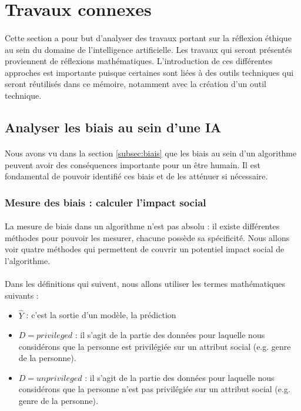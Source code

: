 \documentclass[10pt, french, a4paper]{report}
\begin{document}
\section{Travaux connexes}

\paragraph{}
Cette section a pour but d’analyser des travaux portant sur la réflexion éthique au sein du domaine de l’intelligence artificielle. Les travaux qui seront présentés proviennent de réflexions mathématiques. L’introduction de ces différentes approches est importante puisque certaines sont liées à des outils techniques qui seront réutilisés dans ce mémoire, notamment avec la création d’un outil technique.

\subsection{Analyser les biais au sein d'une IA}

\paragraph{}
Nous avons vu dans la section \ref{subsec:biais} que les biais au sein d'un algorithme peuvent avoir des conséquences importante pour un être humain. Il est fondamental de pouvoir identifié ces biais et de les atténuer si nécessaire. 

\subsubsection{Mesure des biais : calculer l'impact social}

\paragraph{}
La mesure de biais dans un algorithme n'est pas absolu : il existe différentes méthodes pour pouvoir les mesurer, chacune possède sa spécificité. Nous allons voir quatre méthodes qui permettent de couvrir un potentiel impact social de l'algorithme.

\paragraph{}
Dans les définitions qui suivent, nous allons utiliser les termes mathématiques suivants :

\begin{itemize}
  \item $\hat{Y}$ : c'est la sortie d'un modèle, la prédiction
  \item $D = privileged$ : il s'agit de la partie des données pour laquelle nous considérons que la personne est privilégiée sur un attribut social (e.g. genre de la personne).
  \item $D = unprivileged$ : il s'agit de la partie des données pour laquelle nous considérons que la personne n'est pas privilégiée sur un attribut social (e.g. genre de la personne).
\end{itemize}
\end{document}
